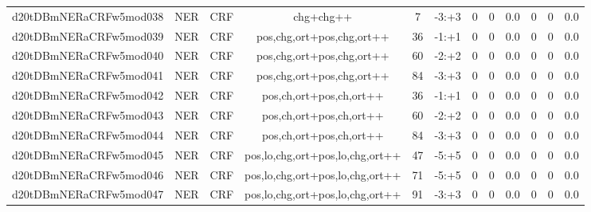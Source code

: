 \documentclass[a4paper]{article}
\begin{document}
\begin{landscape}
\begin{center}
\begin{tabular}{ |c|c|c|c|c|c|c|c|c|c|c|c|}
 
 	
 	\small{ d20tDBmNERaCRFw5mod038 } & \small{ NER} & \small{  CRF }  & chg+chg++  &  7 &  \small{  -3:+3 }  &  0 & 0 & 0.0  &  0 & 0 & 0.0 \\
 	

 
 	
 	\small{ d20tDBmNERaCRFw5mod039 } & \small{ NER} & \small{  CRF }  & pos,chg,ort+pos,chg,ort++  &  36 &  \small{  -1:+1 }  &  0 & 0 & 0.0  &  0 & 0 & 0.0 \\
 	

 
 	
 	\small{ d20tDBmNERaCRFw5mod040 } & \small{ NER} & \small{  CRF }  & pos,chg,ort+pos,chg,ort++  &  60 &  \small{  -2:+2 }  &  0 & 0 & 0.0  &  0 & 0 & 0.0 \\
 	

 
 	
 	\small{ d20tDBmNERaCRFw5mod041 } & \small{ NER} & \small{  CRF }  & pos,chg,ort+pos,chg,ort++  &  84 &  \small{  -3:+3 }  &  0 & 0 & 0.0  &  0 & 0 & 0.0 \\
 	

 
 	
 	\small{ d20tDBmNERaCRFw5mod042 } & \small{ NER} & \small{  CRF }  & pos,ch,ort+pos,ch,ort++  &  36 &  \small{  -1:+1 }  &  0 & 0 & 0.0  &  0 & 0 & 0.0 \\
 	

 
 	
 	\small{ d20tDBmNERaCRFw5mod043 } & \small{ NER} & \small{  CRF }  & pos,ch,ort+pos,ch,ort++  &  60 &  \small{  -2:+2 }  &  0 & 0 & 0.0  &  0 & 0 & 0.0 \\
 	

 
 	
 	\small{ d20tDBmNERaCRFw5mod044 } & \small{ NER} & \small{  CRF }  & pos,ch,ort+pos,ch,ort++  &  84 &  \small{  -3:+3 }  &  0 & 0 & 0.0  &  0 & 0 & 0.0 \\
 	

 
 	
 	\small{ d20tDBmNERaCRFw5mod045 } & \small{ NER} & \small{  CRF }  & pos,lo,chg,ort+pos,lo,chg,ort++  &  47 &  \small{  -5:+5 }  &  0 & 0 & 0.0  &  0 & 0 & 0.0 \\
 	

 
 	
 	\small{ d20tDBmNERaCRFw5mod046 } & \small{ NER} & \small{  CRF }  & pos,lo,chg,ort+pos,lo,chg,ort++  &  71 &  \small{  -5:+5 }  &  0 & 0 & 0.0  &  0 & 0 & 0.0 \\
 	

 
 	
 	\small{ d20tDBmNERaCRFw5mod047 } & \small{ NER} & \small{  CRF }  & pos,lo,chg,ort+pos,lo,chg,ort++  &  91 &  \small{  -3:+3 }  &  0 & 0 & 0.0  &  0 & 0 & 0.0 \\
 	


\end{tabular}
\end{center}
\end{landscape}
\end{document}
